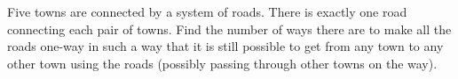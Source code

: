 Five towns are connected by a system of roads. There is exactly one road connecting each pair of towns. Find the number of ways there are to make all the roads one-way in such a way that it is still possible to get from any town to any other town using the roads (possibly passing through other towns on the way).